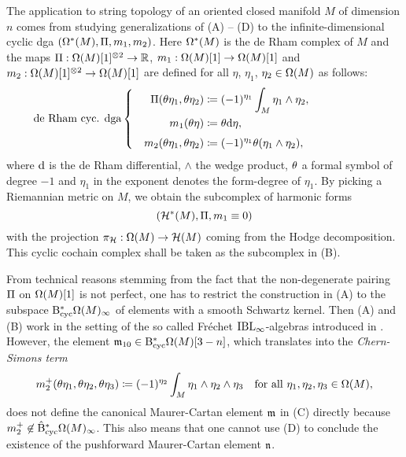 \documentclass[\MainFolder/Text.tex]{subfiles}
\begin{document}
The application to string topology of an oriented closed manifold $M$ of dimension $n$ comes from studying generalizations of (A) -- (D) to the infinite-dimensional cyclic dga $(\Omega^*(M),\allowbreak \Pi,\allowbreak m_1,\allowbreak m_2)$. Here $\Omega^*(M)$ is the de Rham complex of $M$ and the maps $\Pi: \Omega(M)[1]^{\otimes 2} \rightarrow \mathbb{R}$, $m_1: \Omega(M)[1]\rightarrow \Omega(M)[1]$ and $m_2: \Omega(M)[1]^{\otimes 2} \rightarrow \Omega(M)[1]$ are defined for all $\eta$, $\eta_1$, $\eta_2 \in \Omega(M)$ as follows:
\begin{equation} \label{Eq:DeRhamDGA}
 \qquad \mathllap{\text{de Rham cyc. dga}}\left\{ \begin{aligned}
 \Pair(\SuspU\eta_1,\SuspU\eta_2) &\coloneqq (-1)^{\eta_1} \int_M \eta_1\wedge \eta_2, \\ 
 m_1(\SuspU\eta) &\coloneqq \SuspU \Dd \eta,\\[\jot] 
 \quad m_2(\SuspU\eta_1,\SuspU\eta_2) &\coloneqq (-1)^{\eta_1} \SuspU(\eta_1\wedge\eta_2), \end{aligned}\right.
\end{equation}
where $\mathrm{d}$ is the de Rham differential, $\wedge$ the wedge product, $\theta$ a formal symbol of degree $-1$ and $\eta_1$ in the exponent denotes the form-degree of $\eta_1$. By picking a Riemannian metric on $M$, we obtain the subcomplex of harmonic forms 
$$ (\mathcal{H}^*(M), \Pi, m_1 \equiv 0 )$$ 
with the projection $\pi_{\mathcal{H}}: \Omega(M) \rightarrow \mathcal{H}(M)$ coming from the Hodge decomposition. This cyclic cochain complex shall be taken as the subcomplex in (B).

From technical reasons stemming from the fact that the non-degenerate pairing $\Pi$ on $\Omega(M)[1]$ is not perfect, one has to restrict the construction in (A) to the subspace $\mathrm{B}_{\mathrm{cyc}}^* \Omega(M)_\infty$ of elements with a smooth Schwartz kernel. Then (A) and (B) work in the setting of the so called Fr\'echet $\mathrm{IBL}_\infty$-algebras introduced in \cite[Section 13]{Cieliebak2015}. However, the element $\mathfrak{m}_{10} \in \mathrm{B}_{\mathrm{cyc}}^* \Omega(M)[3-n]$, which translates into the \emph{Chern-Simons term}
\begin{equation*} \label{Eq:ChernSimons}
 m_2^+(\theta\eta_1,\theta\eta_2,\theta\eta_3) \coloneqq (-1)^{\eta_2}  \int_M \eta_1\wedge \eta_2\wedge\eta_3\quad\text{for all }\eta_1, \eta_2, \eta_3 \in \Omega(M),
\end{equation*}
does not define the canonical Maurer-Cartan element $\mathfrak{m}$ in (C) directly because $m_2^+ \not\in \hat{\mathrm{B}}_{\mathrm{cyc}}^* \Omega(M)_\infty$. This also means that one cannot use (D) to conclude the existence of the pushforward Maurer-Cartan element $\mathfrak{n}$.
\end{document}
